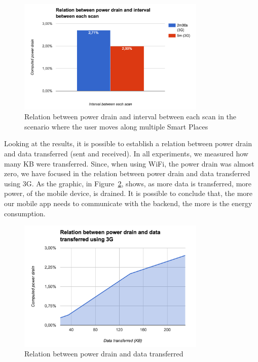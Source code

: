 

\begin{figure}[!ht]
  \centering
    \includegraphics[width=0.8\textwidth, keepaspectratio]{figures/results_battery_walking}
    \caption[Power drain when the user is moving]{Relation between power drain and interval between each scan in the scenario where the user moves along multiple Smart Places}
    \label{fig:results_battery_walking}
\end{figure}

Looking at the results, it is possible to establish a relation between power drain and data transferred (sent and received).
In all experiments, we measured how many \gls{KB} were transferred.
Since, when using \gls{WiFi}, the power drain was almost zero, we have focused in the relation between power drain and data transferred using \gls{3G}.
As the graphic, in Figure~\ref{fig:results_battery_data}, shows, as more data is transferred, more power, of the mobile device, is drained.
It is possible to conclude that, the more our mobile app needs to communicate with the backend, the more is the energy consumption.

\begin{figure}[!ht]
  \centering
    \includegraphics[width=0.8\textwidth, keepaspectratio]{figures/results_battery_data}
    \caption[Power drain vs Data transferred]{Relation between power drain and data transferred}
    \label{fig:results_battery_data}
\end{figure}


